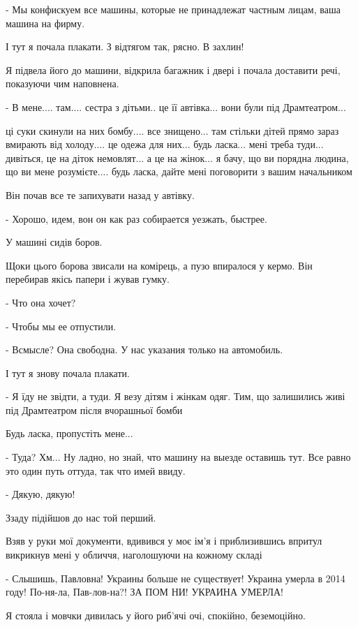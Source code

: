 - Мы конфискуем все машины, которые не принадлежат частным лицам,  ваша машина
на фирму.

І тут я почала плакати. З відтягом так, рясно. В захлин!

Я підвела його до машини, відкрила багажник і двері і почала доставити речі,
показуючи чим наповнена.

- В мене.... там.... сестра з дітьми.. це її автівка... вони були під
Драмтеатром...

ці суки скинули на них бомбу.... все знищено... там стільки дітей прямо зараз
вмирають від холоду.... це одежа для них... будь ласка... мені треба туди...
дивіться, це на діток немовлят... а це на жінок... я бачу, що ви порядна
людина, що ви мене розумієте.... будь ласка, дайте мені поговорити з вашим
начальником 

Він почав все те запихувати назад у автівку. 

- Хорошо, идем, вон он как раз собирается уезжать, быстрее.

У машині сидів боров. 

Щоки цього борова звисали на комірець, а пузо впиралося у кермо. Він перебирав
якісь папери і жував гумку.

- Что она хочет?

- Чтобы мы ее отпустили. 

- Всмысле? Она свободна. У нас указания только  на автомобиль.

І тут я знову почала плакати.

- Я їду не звідти,  а туди. Я везу дітям і жінкам одяг. Тим, що залишились живі
під Драмтеатром після вчорашньої бомби 

Будь ласка, пропустіть мене...

- Туда? Хм... Ну ладно, но знай,  что машину на выезде оставишь тут. Все равно
это один путь оттуда, так что имей ввиду.

- Дякую, дякую!

Ззаду підійшов до нас той перший. 


Взяв у руки мої документи,  вдивився у моє ім'я і приблизившись впритул
викрикнув мені у обличчя, наголошуючи на кожному складі

- Слышишь, Павловна! Украины больше не существует! Украина умерла в 2014 году!
По-ня-ла, Пав-лов-на?! ЗА ПОМ НИ! УКРАИНА УМЕРЛА!

Я стояла і мовчки дивилась у його риб'ячі очі, спокійно, беземоційно. 

